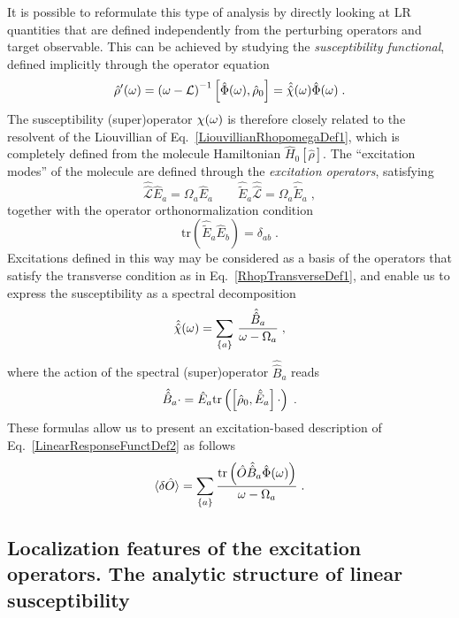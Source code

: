 \documentclass[reprint,aps,prb]{revtex4-1}
\newcommand{\be}{\begin{equation}}
\newcommand{\ee}{\end{equation}}
\newcommand{\nn}{\notag}
\newcommand{\qq}{\qquad}
\newcommand{\lb}{\label}
\newcommand{\op}[1]{\hat {#1}}
\newcommand{\sop}[1]{\op{\op {#1}}}
\newcommand{\commutator}[2]{\left[ {#1} , {#2} \right]}
\newcommand{\trace}[1]{\mathrm{tr}\left(#1\right)}
\newcommand{\dmnot}{\op{\rho}_0}
\newcommand{\dm}{\op{\rho}}
\newcommand{\hnot}{\op{H}_0}
\newcommand{\Liouv}{\sop{\mathcal L}}
\begin{document}
It is possible to reformulate this type of analysis by directly looking at LR quantities that are defined independently from the perturbing operators and target observable. This can be achieved by studying the \emph{susceptibility functional}, defined implicitly through the operator equation
\be\lb{SusceptibilityDef1}
\dm'(\omega) = \left(\omega -\mathcal L \right)^{-1} \commutator{\op \Phi(\omega)}{\dmnot} = \sop{{\cal \chi}}(\omega) \op\Phi(\omega) \;.
\ee
The susceptibility (super)operator $\cal \chi(\omega)$ is therefore closely related to the resolvent of the Liouvillian of Eq.~\eqref{LiouvillianRhopomegaDef1}, which is completely defined
from the molecule Hamiltonian $\hnot[\dm]$.
The ``excitation modes''  of the molecule are defined through the \emph{excitation operators}, satisfying
\be\lb{ExcitationOperatorsDef1}
\Liouv \op E_a = \Omega_a \op E_a \qq \op{\tilde E}_a \Liouv = \Omega_a \op{\tilde E}_a \;,
\ee
together with the operator orthonormalization condition %
\be\lb{orthoExcitatioOpDef1}
\trace{\op{\tilde E}_a\op E_b} = \delta_{ab} \;.
\ee
Excitations defined in this way may be considered as a basis of the operators that satisfy the transverse condition as in
Eq.~\eqref{RhopTransverseDef1}, and enable us to express the susceptibility as a spectral decomposition
\be\lb{RhopExcitationDef1}
\sop{{\cal \chi}}(\omega) = \sum_{\{a\}} \,
\frac{\sop B_a}{\omega-\Omega_a} \;,
\ee
where the action of the spectral (super)operator $\sop B_a$ reads
\be\lb{spectralop}
  \sop B_a \cdot = \op E_a \trace{\commutator{\dmnot}{\op{\tilde E}_a} \cdot} \;. \nn
\ee
These formulas allow us to present an excitation-based description of Eq.~\eqref{LinearResponseFunctDef2} as follows
\be\lb{deltaoexc}
  \braket{\delta \op O} =  \sum_{\{a\}} \frac{\trace{\op O \sop B_a \op \Phi(\omega)}}{\omega -\Omega_a}\;.
\ee

\subsection{Localization features of the excitation operators. The analytic structure of linear susceptibility}
\end{document}
